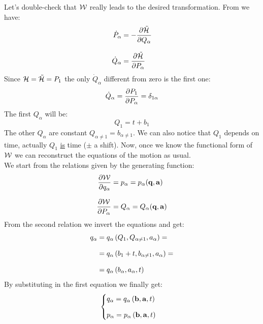 Let's double-check that $\mathcal{W}$ really leads to the desired transformation. From \hamiltonref\;we have:
\begin{equation}
  \begin{split}
    \dot{P}_{\alpha} &= -\pdv{\tilde{\hamfun}}{Q_{\alpha}}\\[8pt]
    \dot{Q}_{\alpha} &= \pdv{\tilde{\hamfun}}{P_{\alpha}}
  \end{split}
\end{equation}
Since $\mathcal{H} = \tilde{\mathcal{H}} = P_1$ the only $\dot{Q}_{\alpha}$ different from zero is the first one:
\begin{equation}
  \dot{Q}_{\alpha} = \pdv{P_1}{P_{\alpha}} = \delta_{1\alpha}
\end{equation}
The first $Q_{\alpha}$ will be:
\begin{equation}
  Q_1 = t + b_1
\end{equation}
The other $Q_{\alpha}$ are constant $Q_{\alpha \neq 1} = b_{\alpha \neq 1}$. We can also notice that $Q_1$ depends on time, actually $Q_1$ \underline{is} time ($\pm$ a shift). Now, once we know the functional form of $\mathcal{W}$ we can reconstruct the equations of the motion as usual.\\
We start from the relations given by the generating function:
\begin{equation}
  \begin{split}
    \pdv{\hamch}{q_{\alpha}} &= p_{\alpha} = p_{\alpha}(\vec{q},\vec{a})\\[8pt]
    \pdv{\hamch}{P_{\alpha}} &= Q_{\alpha} = Q_{\alpha}(\vec{q},\vec{a})
  \end{split}
\end{equation}
From the second relation we invert the equations and get:
\begin{equation}
  \begin{split}
    q_{\alpha} &= q_{\alpha}\left(Q_{1},Q_{\alpha \neq 1},a_{\alpha}\right) =\\[8pt]
    &= q_{\alpha}\left(b_1 + t,b_{\alpha \neq 1},a_{\alpha}\right) =\\[8pt]
    &= q_{\alpha}\left(b_{\alpha},a_{\alpha},t\right)
  \end{split}
\end{equation}
By substituting in the first equation we finally get:
\begin{equation}
  \begin{cases}
    q_{\alpha} = q_{\alpha}\left(\vb{b},\vb{a},t\right)\\[8pt]
    p_{\alpha} = p_{\alpha}\left(\vb{b},\vb{a},t\right)
  \end{cases}
\end{equation}
